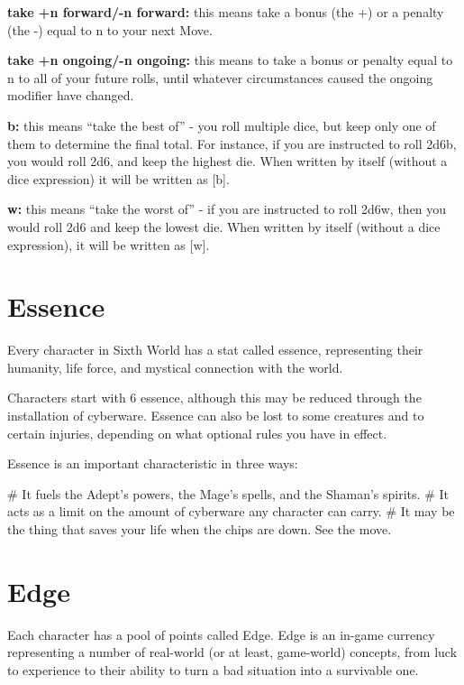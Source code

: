 \textbf{take +n forward/-n forward:} this means take a bonus (the +) or a penalty (the -) equal to n to your next Move.

\textbf{take +n ongoing/-n ongoing:} this means to take a bonus or penalty equal to n to all of your future rolls, until whatever circumstances caused the ongoing modifier have changed.

\textbf{b:} this means ``take the best of'' - you roll multiple dice, but keep only one of them to determine the final total. For instance, if you are instructed to roll 2d6b, you would roll 2d6, and keep the highest die. When written by itself (without a dice expression) it will be written as [b].

\textbf{w:} this means ``take the worst of'' - if you are instructed to roll 2d6w, then you would roll 2d6 and keep the lowest die. When written by itself (without a dice expression), it will be written as [w].


\section{Essence}

Every character in Sixth World has a stat called essence, representing their humanity, life force, and mystical connection with the world.

Characters start with 6 essence, although this may be reduced through the installation of cyberware. Essence can also be lost to some creatures and to certain injuries, depending on what optional rules you have in effect.

Essence is an important characteristic in three ways:

\begin{easylist}
    # It fuels the Adept’s powers, the Mage’s spells, and the Shaman’s spirits.
    # It acts as a limit on the amount of cyberware any character can carry.
    # It may be the thing that saves your life when the chips are down. See the  move.
\end{easylist}


\section{Edge}

Each character has a pool of points called Edge. Edge is an in-game currency representing a number of real-world (or at least, game-world) concepts, from luck to experience to their ability to turn a bad situation into a survivable one.

